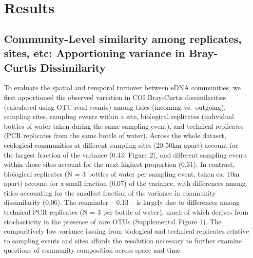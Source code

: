 \documentclass[fleqn,10pt,lineno]{wlpeerj} %
\begin{document}
\section{Results}\label{results}

\subsection{Community-Level similarity among replicates, sites, etc:
Apportioning variance in Bray-Curtis
Dissimilarity}\label{community-level-similarity-among-replicates-sites-etc-apportioning-variance-in-bray-curtis-dissimilarity}

To evaluate the spatial and temporal turnover between eDNA communities,
we first apportioned the observed variation in COI Bray-Curtis
dissimilarities (calculated using OTU read counts) among tides (incoming
vs.~outgoing), sampling sites, sampling events within a site, biological
replicates (individual bottles of water taken during the same sampling
event), and technical replicates (PCR replicates from the same bottle of
water). Across the whole dataset, ecological communities at different
sampling sites (20-50km apart) account for the largest fraction of the
variance (0.43; Figure 2), and different sampling events within those
sites account for the next highest proportion (0.31). In contrast,
biological replicates (N = 3 bottles of water per sampling event, taken
ca. 10m apart) account for a small fraction (0.07) of the variance, with
differences among tides accounting for the smallest fraction of the
variance in community dissimilarity (0.06). The remainder -- 0.13 -- is
largely due to differences among technical PCR replicates (N = 3 per
bottle of water), much of which derives from stochasticity in the
presence of rare OTUs (Supplemental Figure 1). The comparitively low
variance issuing from biological and technical replicates relative to
sampling events and sites affords the resolution necessary to further
examine questions of community composition across space and time.
\end{document}
